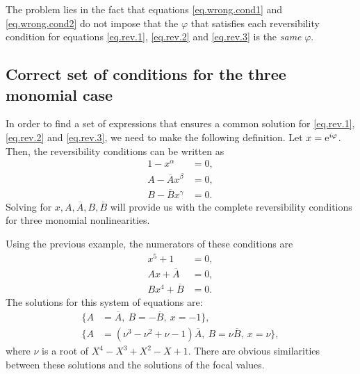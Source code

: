\begin{observacio}
The problem lies in the fact that equations \eqref{eq.wrong.cond1} and \eqref{eq.wrong.cond2} do not impose that the $\varphi$ that satisfies each reversibility condition for equations \eqref{eq.rev.1}, \eqref{eq.rev.2} and \eqref{eq.rev.3} is the \emph{same} $\varphi$.
\end{observacio}


\subsection{Correct set of conditions for the three monomial case}

In order to find a set of expressions that ensures a common solution for \eqref{eq.rev.1}, \eqref{eq.rev.2} and \eqref{eq.rev.3}, we need to make the following definition. Let $x=\mathrm{e}^{i \varphi}$. Then, the reversibility conditions can be written as
\begin{align}
1-x^\alpha&=0,\label{eq.rev1}\\
A-\overline A x^\beta &=0,\label{eq.rev2}\\
B-\overline B x^\gamma &=0.\label{eq.rev3}
\end{align}
Solving for $x,A,\overline A,B,\overline B$ will provide us with the complete reversibility conditions for three monomial nonlinearities.

Using the previous example, the numerators of these conditions are
\begin{align*}
x^5+1 &= 0,\\
Ax+\overline A &=0,\\
Bx^4+\overline B &=0.
\end{align*}
The solutions for this system of equations are:
\begin{align*}
\{A&=\overline A, ~B=-\overline B, ~x=-1\},\\
\{A&=(\nu^3-\nu^2+\nu-1)\overline A, ~B=\nu\overline B, ~x=\nu\},
\end{align*}
where $\nu$ is a root of $X^4-X^3+X^2-X+1$. There are obvious similarities between these solutions and the solutions of the focal values.

